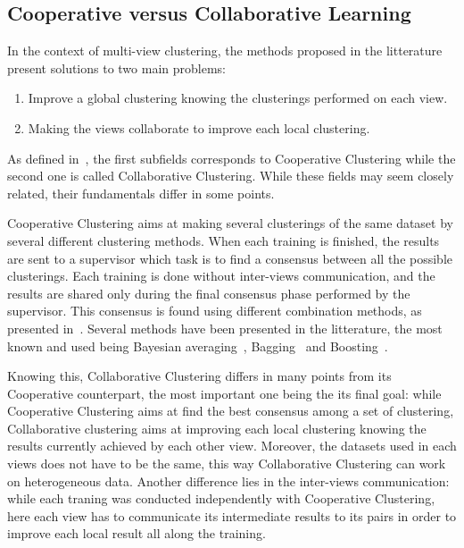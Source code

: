 \documentclass[a4paper]{report}
\begin{document}
    \subsection{Cooperative versus Collaborative Learning}
    In the context of multi-view clustering, the methods proposed in the litterature present solutions to two main problems:

    \begin{enumerate}
        \item Improve a global clustering knowing the clusterings performed on each view.
        \item Making the views collaborate to improve each local clustering.
    \end{enumerate}

    As defined in~\cite{cornuejols2018collaborative}, the first subfields corresponds to Cooperative Clustering while the second one is called Collaborative Clustering. While these fields may seem closely related, their fundamentals differ in some points.

    Cooperative Clustering aims at making several clusterings of the same dataset by several different clustering methods. When each training is finished, the results are sent to a supervisor which task is to find a consensus between all the possible clusterings. Each training is done without inter-views communication, and the results are shared only during the final consensus phase performed by the supervisor. This consensus is found using different combination methods, as presented in~\cite{kittler1998combining,dietterich2000ensemble}. Several methods have been presented in the litterature, the most known and used being Bayesian averaging~\cite{kittler1998combining}, Bagging~\cite{breiman1996bagging} and Boosting~\cite{freund1997decision}.

    Knowing this, Collaborative Clustering differs in many points from its Cooperative counterpart, the most important one being the its final goal: while Cooperative Clustering aims at find the best consensus among a set of clustering, Collaborative clustering aims at improving each local clustering knowing the results currently achieved by each other view. Moreover, the datasets used in each views does not have to be the same, this way Collaborative Clustering can work on heterogeneous data. Another difference lies in the inter-views communication: while each traning was conducted independently with Cooperative Clustering, here each view has to communicate its intermediate results to its pairs in order to improve each local result all along the training.
    
\end{document}

